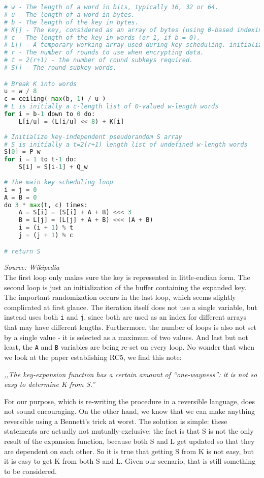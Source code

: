 \documentclass[a4paper,10pt,openright]{memoir}
\newcommand{\code}[1]{\texttt{#1}}
\begin{document}
\begin{lstlisting}[language=Python]
# w - The length of a word in bits, typically 16, 32 or 64.
# u - The length of a word in bytes.
# b - The length of the key in bytes.
# K[] - The key, considered as an array of bytes (using 0-based indexing).
# c - The length of the key in words (or 1, if b = 0).
# L[] - A temporary working array used during key scheduling. initialized to the key in words.
# r - The number of rounds to use when encrypting data.
# t = 2(r+1) - the number of round subkeys required.
# S[] - The round subkey words.

# Break K into words
u = w / 8
c = ceiling( max(b, 1) / u )
# L is initially a c-length list of 0-valued w-length words
for i = b-1 down to 0 do:
    L[i/u] = (L[i/u] << 8) + K[i]
     
# Initialize key-independent pseudorandom S array
# S is initially a t=2(r+1) length list of undefined w-length words
S[0] = P_w
for i = 1 to t-1 do:
    S[i] = S[i-1] + Q_w
    
# The main key scheduling loop
i = j = 0
A = B = 0
do 3 * max(t, c) times:
    A = S[i] = (S[i] + A + B) <<< 3
    B = L[j] = (L[j] + A + B) <<< (A + B)
    i = (i + 1) % t
    j = (j + 1) % c

# return S
\end{lstlisting}
\textit{\footnotesize Source: Wikipedia}\\

The first loop only makes sure the key is represented in little-endian 
form. The second loop is just an initialization of the buffer 
containing the expanded key. The important randomization occurs in the 
last loop, which seems slightly complicated at first glance. The 
iteration itself does not use a single variable, but instead uses both 
\code{i} and \code{j}, since both are used as an index for different 
arrays that may have different lengths. Furthermore, the number of 
loops is also not set by a single value - it is selected as a maximum 
of two values. And last but not least, the \code{A} and \code{B} 
variables are being re-set on every loop. No wonder that when we look 
at the paper establishing RC5, we find this note: 

\textit{,,The key-expansion function has a certain amount of 
``one-wayness'': it is not so easy to determine K from S.''}

For our purpose, which is re-writing the procedure in a reversible 
language, does not sound encouraging. On the other hand, we know that 
we can make anything reversible using a Bennett's trick at worst. The 
solution is simple: these statements are actually not 
mutually-exclusive: the fact is that S is not the only result of the 
expansion function, because both S and L get updated so that they are 
dependent on each other. So it is true that getting S from K is not 
easy, but it is easy to get K from both S and L. Given our scenario, 
that is still something to be considered.
\end{document}
